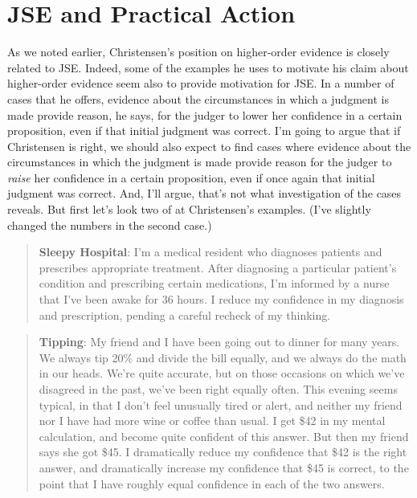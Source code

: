 \documentclass[
  11pt,
  letterpaper,
  DIV=11,
  numbers=noendperiod,
  twoside]{scrartcl}
\begin{document}
\section{JSE and Practical Action}\label{jse-and-practical-action}

As we noted earlier, Christensen's position on higher-order evidence is
closely related to JSE. Indeed, some of the examples he uses to motivate
his claim about higher-order evidence seem also to provide motivation
for JSE. In a number of cases that he offers, evidence about the
circumstances in which a judgment is made provide reason, he says, for
the judger to lower her confidence in a certain proposition, even if
that initial judgment was correct. I'm going to argue that if
Christensen is right, we should also expect to find cases where evidence
about the circumstances in which the judgment is made provide reason for
the judger to \emph{raise} her confidence in a certain proposition, even
if once again that initial judgment was correct. And, I'll argue, that's
not what investigation of the cases reveals. But first let's look two of
at Christensen's examples. (I've slightly changed the numbers in the
second case.)

\begin{quote}
\textbf{Sleepy Hospital}: I'm a medical resident who diagnoses patients
and prescribes appropriate treatment. After diagnosing a particular
patient's condition and prescribing certain medications, I'm informed by
a nurse that I've been awake for 36 hours. I reduce my confidence in my
diagnosis and prescription, pending a careful recheck of my thinking.
\end{quote}

\begin{quote}
\textbf{Tipping}: My friend and I have been going out to dinner for many
years. We always tip 20\% and divide the bill equally, and we always do
the math in our heads. We're quite accurate, but on those occasions on
which we've disagreed in the past, we've been right equally often. This
evening seems typical, in that I don't feel unusually tired or alert,
and neither my friend nor I have had more wine or coffee than usual. I
get \$42 in my mental calculation, and become quite confident of this
answer. But then my friend says she got \$45. I dramatically reduce my
confidence that \$42 is the right answer, and dramatically increase my
confidence that \$45 is correct, to the point that I have roughly equal
confidence in each of the two answers.
\end{quote}
\end{document}

